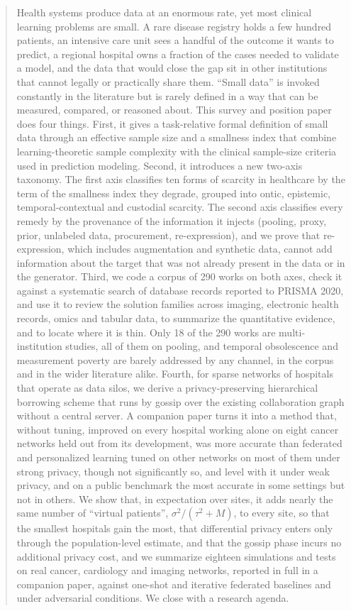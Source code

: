 \documentclass[acmsmall,screen,review]{acmart}
\theoremstyle{acmdefinition}
\begin{document}
\begin{abstract}
Health systems produce data at an enormous rate, yet most clinical learning problems are small. A rare disease registry holds a few hundred patients, an intensive care unit sees a handful of the outcome it wants to predict, a regional hospital owns a fraction of the cases needed to validate a model, and the data that would close the gap sit in other institutions that cannot legally or practically share them. ``Small data'' is invoked constantly in the literature but is rarely defined in a way that can be measured, compared, or reasoned about. This survey and position paper does four things. First, it gives a task-relative formal definition of small data through an effective sample size and a smallness index that combine learning-theoretic sample complexity with the clinical sample-size criteria used in prediction modeling. Second, it introduces a new two-axis taxonomy. The first axis classifies ten forms of scarcity in healthcare by the term of the smallness index they degrade, grouped into ontic, epistemic, temporal-contextual and custodial scarcity. The second axis classifies every remedy by the provenance of the information it injects (pooling, proxy, prior, unlabeled data, procurement, re-expression), and we prove that re-expression, which includes augmentation and synthetic data, cannot add information about the target that was not already present in the data or in the generator. Third, we code a corpus of 290 works on both axes, check it against a systematic search of \PrismaEligible{} database records reported to PRISMA 2020, and use it to review the solution families across imaging, electronic health records, omics and tabular data, to summarize the quantitative evidence, and to locate where it is thin. Only 18 of the 290 works are multi-institution studies, all of them on pooling, and temporal obsolescence and measurement poverty are barely addressed by any channel, in the corpus and in the wider literature alike. Fourth, for sparse networks of hospitals that operate as data silos, we derive a privacy-preserving hierarchical borrowing scheme that runs by gossip over the existing collaboration graph without a central server. A companion paper turns it into a method that, without tuning, improved on every hospital working alone on eight cancer networks held out from its development, was more accurate than federated and personalized learning tuned on other networks on most of them under strong privacy, though not significantly so, and level with it under weak privacy, and on a public benchmark the most accurate in some settings but not in others. We show that, in expectation over sites, it adds nearly the same number of ``virtual patients'', $\sigma^2/(\tau^2+M)$, to every site, so that the smallest hospitals gain the most, that differential privacy enters only through the population-level estimate, and that the gossip phase incurs no additional privacy cost, and we summarize eighteen simulations and tests on real cancer, cardiology and imaging networks, reported in full in a companion paper, against one-shot and iterative federated baselines and under adversarial conditions. We close with a research agenda.
\end{abstract}
\end{document}
